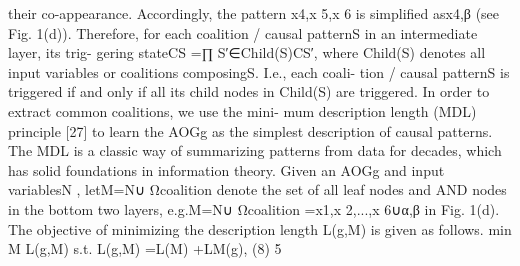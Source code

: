 their co-appearance. Accordingly, the pattern {x4,x 5,x 6}
is simpliﬁed as{x4,β} (see Fig. 1(d)). Therefore, for each
coalition / causal patternS in an intermediate layer, its trig-
gering stateCS =∏
S′∈Child(S)CS′, where Child(S) denotes
all input variables or coalitions composingS. I.e., each coali-
tion / causal patternS is triggered if and only if all its child
nodes in Child(S) are triggered.
In order to extract common coalitions, we use the mini-
mum description length (MDL) principle [27] to learn the
AOGg as the simplest description of causal patterns. The
MDL is a classic way of summarizing patterns from data for
decades, which has solid foundations in information theory.
Given an AOGg and input variablesN , letM=N∪ Ωcoalition
denote the set of all leaf nodes and AND nodes in the bottom
two layers, e.g.M=N∪ Ωcoalition ={x1,x 2,...,x 6}∪{α,β} in
Fig. 1(d). The objective of minimizing the description length
L(g,M) is given as follows.
min
M
L(g,M) s.t. L(g,M) =L(M) +LM(g), (8)
5
